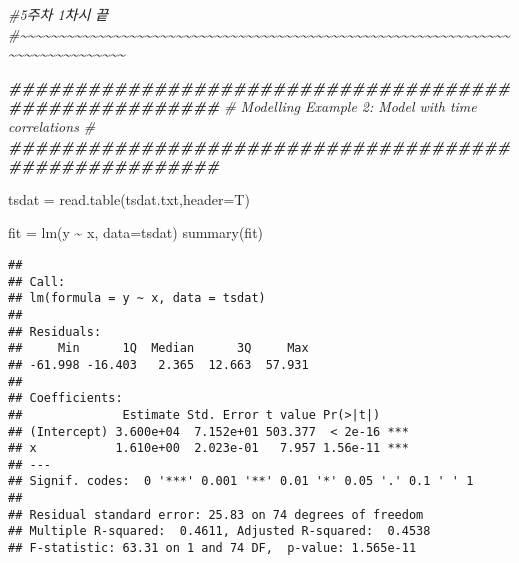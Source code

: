 \documentclass[
]{article}
\newenvironment{Shaded}{\begin{snugshade}}{\end{snugshade}}
\newcommand{\AttributeTok}[1]{\textcolor[rgb]{0.77,0.63,0.00}{#1}}
\newcommand{\CommentTok}[1]{\textcolor[rgb]{0.56,0.35,0.01}{\textit{#1}}}
\newcommand{\DocumentationTok}[1]{\textcolor[rgb]{0.56,0.35,0.01}{\textbf{\textit{#1}}}}
\newcommand{\FunctionTok}[1]{\textcolor[rgb]{0.00,0.00,0.00}{#1}}
\newcommand{\NormalTok}[1]{#1}
\newcommand{\OtherTok}[1]{\textcolor[rgb]{0.56,0.35,0.01}{#1}}
\newcommand{\SpecialCharTok}[1]{\textcolor[rgb]{0.00,0.00,0.00}{#1}}
\newcommand{\StringTok}[1]{\textcolor[rgb]{0.31,0.60,0.02}{#1}}
\begin{document}
\begin{Shaded}
\begin{Highlighting}[]
\CommentTok{\#5주차 1차시 끝}
\CommentTok{\#\textasciitilde{}\textasciitilde{}\textasciitilde{}\textasciitilde{}\textasciitilde{}\textasciitilde{}\textasciitilde{}\textasciitilde{}\textasciitilde{}\textasciitilde{}\textasciitilde{}\textasciitilde{}\textasciitilde{}\textasciitilde{}\textasciitilde{}\textasciitilde{}\textasciitilde{}\textasciitilde{}\textasciitilde{}\textasciitilde{}\textasciitilde{}\textasciitilde{}\textasciitilde{}\textasciitilde{}\textasciitilde{}\textasciitilde{}\textasciitilde{}\textasciitilde{}\textasciitilde{}\textasciitilde{}\textasciitilde{}\textasciitilde{}\textasciitilde{}\textasciitilde{}\textasciitilde{}\textasciitilde{}\textasciitilde{}\textasciitilde{}\textasciitilde{}\textasciitilde{}\textasciitilde{}\textasciitilde{}\textasciitilde{}\textasciitilde{}\textasciitilde{}\textasciitilde{}\textasciitilde{}\textasciitilde{}\textasciitilde{}\textasciitilde{}\textasciitilde{}\textasciitilde{}\textasciitilde{}\textasciitilde{}\textasciitilde{}\textasciitilde{}\textasciitilde{}\textasciitilde{}\textasciitilde{}\textasciitilde{}\textasciitilde{}\textasciitilde{}\textasciitilde{}\textasciitilde{}\textasciitilde{}\textasciitilde{}\textasciitilde{}\textasciitilde{}\textasciitilde{}\textasciitilde{}\textasciitilde{}\textasciitilde{}\textasciitilde{}\textasciitilde{}\textasciitilde{}\textasciitilde{}\textasciitilde{}\textasciitilde{}}


\DocumentationTok{\#\#\#\#\#\#\#\#\#\#\#\#\#\#\#\#\#\#\#\#\#\#\#\#\#\#\#\#\#\#\#\#\#\#\#\#\#\#\#\#\#\#\#\#\#\#\#\#\#\#\#\#\#\#}
\CommentTok{\# Modelling Example 2:  Model with time correlations \#}
\DocumentationTok{\#\#\#\#\#\#\#\#\#\#\#\#\#\#\#\#\#\#\#\#\#\#\#\#\#\#\#\#\#\#\#\#\#\#\#\#\#\#\#\#\#\#\#\#\#\#\#\#\#\#\#\#\#\#}

\NormalTok{tsdat }\OtherTok{=} \FunctionTok{read.table}\NormalTok{(}\StringTok{\textquotesingle{}tsdat.txt\textquotesingle{}}\NormalTok{,}\AttributeTok{header=}\NormalTok{T)}

\NormalTok{fit }\OtherTok{=} \FunctionTok{lm}\NormalTok{(y }\SpecialCharTok{\textasciitilde{}}\NormalTok{ x, }\AttributeTok{data=}\NormalTok{tsdat)}
\FunctionTok{summary}\NormalTok{(fit)}
\end{Highlighting}
\end{Shaded}

\begin{verbatim}
## 
## Call:
## lm(formula = y ~ x, data = tsdat)
## 
## Residuals:
##     Min      1Q  Median      3Q     Max 
## -61.998 -16.403   2.365  12.663  57.931 
## 
## Coefficients:
##              Estimate Std. Error t value Pr(>|t|)    
## (Intercept) 3.600e+04  7.152e+01 503.377  < 2e-16 ***
## x           1.610e+00  2.023e-01   7.957 1.56e-11 ***
## ---
## Signif. codes:  0 '***' 0.001 '**' 0.01 '*' 0.05 '.' 0.1 ' ' 1
## 
## Residual standard error: 25.83 on 74 degrees of freedom
## Multiple R-squared:  0.4611, Adjusted R-squared:  0.4538 
## F-statistic: 63.31 on 1 and 74 DF,  p-value: 1.565e-11
\end{verbatim}
\end{document}
